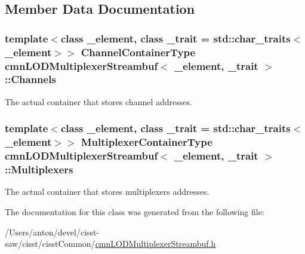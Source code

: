 \subsection{Member Data Documentation}
\hypertarget{classcmn_l_o_d_multiplexer_streambuf_a1a7cbbb28f587e83e402b6ea663bd387}{}
\subsubsection[{Channels}]{\setlength{\rightskip}{0pt plus 5cm}template$<$class \+\_\+element, class \+\_\+trait = std\+::char\+\_\+traits$<$\+\_\+element$>$$>$ {\bf Channel\+Container\+Type} {\bf cmn\+L\+O\+D\+Multiplexer\+Streambuf}$<$ \+\_\+element, \+\_\+trait $>$\+::Channels\hspace{0.3cm}{\ttfamily [protected]}}\label{classcmn_l_o_d_multiplexer_streambuf_a1a7cbbb28f587e83e402b6ea663bd387}
The actual container that stores channel addresses. \hypertarget{classcmn_l_o_d_multiplexer_streambuf_a775d4551d9e37fcca0c27f699a98b838}{}
\subsubsection[{Multiplexers}]{\setlength{\rightskip}{0pt plus 5cm}template$<$class \+\_\+element, class \+\_\+trait = std\+::char\+\_\+traits$<$\+\_\+element$>$$>$ {\bf Multiplexer\+Container\+Type} {\bf cmn\+L\+O\+D\+Multiplexer\+Streambuf}$<$ \+\_\+element, \+\_\+trait $>$\+::Multiplexers\hspace{0.3cm}{\ttfamily [protected]}}\label{classcmn_l_o_d_multiplexer_streambuf_a775d4551d9e37fcca0c27f699a98b838}
The actual container that stores multiplexers addresses. 

The documentation for this class was generated from the following file\+:\begin{DoxyCompactItemize}
\item 
/\+Users/anton/devel/cisst-\/saw/cisst/cisst\+Common/\hyperlink{cmn_l_o_d_multiplexer_streambuf_8h}{cmn\+L\+O\+D\+Multiplexer\+Streambuf.\+h}\end{DoxyCompactItemize}
